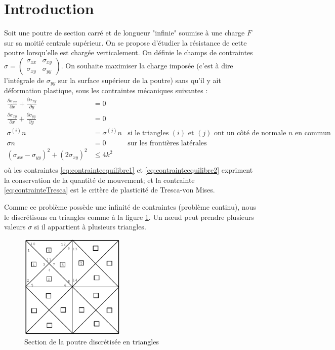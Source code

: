 \section*{Introduction}
Soit une poutre de section carré et de longueur "infinie" soumise à une charge $F$ sur sa moitié centrale supérieur. On se propose d'étudier la résistance de cette poutre lorsqu'elle est chargée verticalement. On définie le champs de contraintes $\sigma = \begin{pmatrix}
\sigma_{xx} & \sigma_{xy}\\
\sigma_{xy} & \sigma_{yy}
\end{pmatrix}$. On souhaite maximiser la charge imposée (c'est à dire l'intégrale de $\sigma_{yy}$ sur la surface supérieur de la poutre) sans qu'il y ait déformation plastique, sous les contraintes mécaniques suivantes : 
\begin{align}
\frac{\partial \sigma_{xx}}{\partial x} + \frac{\partial \sigma_{xy}}{\partial y} &= 0 \label{eq:contrainteequilibre1}\\
\frac{\partial \sigma_{xy}}{\partial x} + \frac{\partial \sigma_{yy}}{\partial y} &= 0\label{eq:contrainteequilibre2}\\
\sigma^{(i)}n &= \sigma^{(j)}n & \text{si le triangles $(i)$ et $(j)$ ont un côté de normale $n$ en commun} \label{eq:contrainteContinuite}\\
\sigma n &= 0 & \text{sur les frontières latérales} \label{eq:contrainteFrontiere} \\
(\sigma_{xx} - \sigma_{yy})^2 + (2 \sigma_{xy})^2 & \leq 4 k^2 \label{eq:contrainteTresca}\\
\end{align}
où les contraintes \eqref{eq:contrainteequilibre1} et \eqref{eq:contrainteequilibre2} expriment la conservation de la quantité de mouvement; et la contrainte \eqref{eq:contrainteTresca} est le critère de plasticité de Tresca-von Mises. 


Comme ce problème possède une infinité de contraintes (problème continu), nous le discrétisons en triangles comme à la figure \ref{fig:discretisation}. Un nœud peut prendre plusieurs valeurs $\sigma$ si il appartient à plusieurs triangles. 

\begin{figure}[h!]
\centering
\includegraphics[height=5cm]{images/discretisation.png}
\caption{Section de la poutre discrétisée en triangles}
\label{fig:discretisation}
\end{figure}


